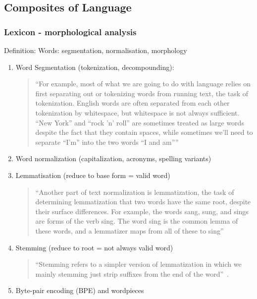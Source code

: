 \documentclass[11pt]{article}
\begin{document}
\subsection{Composites of Language}

\subsubsection{Lexicon - morphological analysis}

Definition: Words: segmentation, normalisation, morphology

\begin{enumerate}
    \item Word Segmentation (tokenization, decompounding): 
    \begin{quote}
        ``For example, most of what we are going to do with language relies on first separating out or tokenizing words from running text, the task of tokenization. English words are often separated from each other tokenization by whitespace, but whitespace is not always sufficient. ``New York'' and ``rock 'n' roll'' are sometimes treated as large words despite the fact that they contain spaces, while sometimes we'll need to separate ``I'm'' into the two words ``I and am''''~\cite{book-speech-and-language-processing}
    \end{quote}
    \item Word normalization (capitalization, acronyms, spelling variants)
    \item Lemmatisation (reduce to base form = valid word)
    \begin{quote}
        ``Another part of text normalization is lemmatization, the task of determining lemmatization that two words have the same root, despite their surface differences. For example, the words sang, sung, and sings are forms of the verb sing. The word sing is the common lemma of these words, and a lemmatizer maps from all of these to sing''~\cite{book-speech-and-language-processing}
    \end{quote}
    \item Stemming (reduce to root = not always valid word)
    \begin{quote}
        ``Stemming refers to a simpler version of lemmatization in which we mainly stemming just strip suffixes from the end of the word''~\cite{book-speech-and-language-processing}.
    \end{quote}
    \item Byte-pair encoding (BPE) and wordpieces
    

\end{enumerate}
\end{document}
